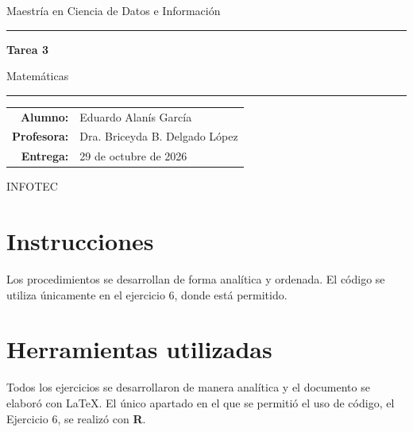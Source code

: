 \documentclass[11pt,letterpaper]{article}
\newcommand{\asignaturaNombre}{Matemáticas}
\newcommand{\tareaNombre}{Tarea 3}
\newcommand{\autorNombre}{Eduardo Alanís García}
\newcommand{\profesorNombre}{Dra. Briceyda B. Delgado López}
\newcommand{\fechaEntrega}{29 de octubre de 2026}
\theoremstyle{coloredplain}
\theoremstyle{coloreddef}
\begin{document}

\begin{titlepage}
  \thispagestyle{plain}
  \centering
  \vspace*{2.5cm}

  {\sffamily\color{secondary}\large Maestría en Ciencia de Datos e Información \par}
  \vspace{0.3cm}
  {\color{primary}\rule{0.5\textwidth}{0.8pt}\par}
  \vspace{2.2cm}

  {\sffamily\bfseries\color{primary}\Huge \tareaNombre \par}
  \vspace{0.6cm}
  {\sffamily\Large \asignaturaNombre \par}

  \vspace{3.5cm}
  {\color{primary!60}\rule{0.6\textwidth}{0.4pt}\par}
  \vspace{1cm}

  \begin{tabular}{rl}
    \textbf{Alumno:}   & \autorNombre \\[2pt]
    \textbf{Profesora:} & \profesorNombre \\[2pt]
    \textbf{Entrega:}    & \fechaEntrega \\
  \end{tabular}

  \vfill
  {\small\color{secondary} INFOTEC \par}
\end{titlepage}



\section*{Instrucciones}
Los procedimientos se desarrollan de forma analítica y ordenada. El código se utiliza únicamente en el ejercicio 6, donde está permitido.

\section*{Herramientas utilizadas}
Todos los ejercicios se desarrollaron de manera analítica y el documento se elaboró con \LaTeX{}. El único apartado en el que se permitió el uso de código, el Ejercicio 6, se realizó con \textbf{R}.
\end{document}

